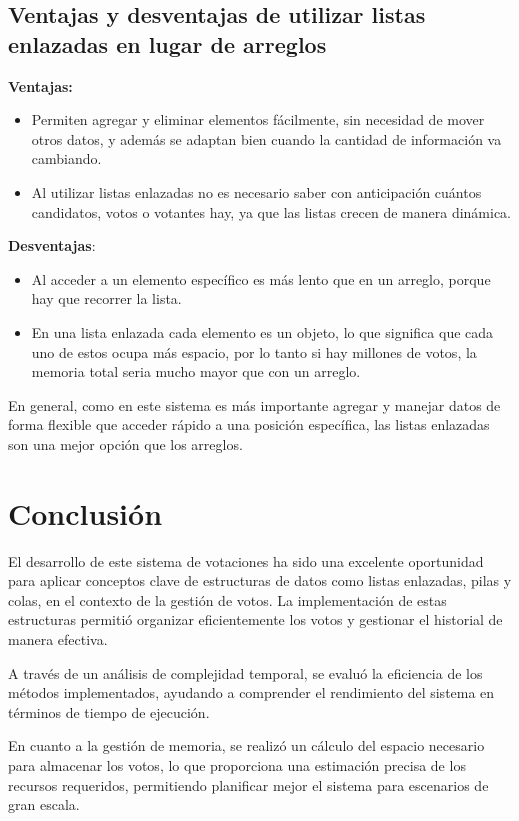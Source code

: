 \documentclass[12pt]{article}
\begin{document}
\subsection{Ventajas y desventajas de utilizar listas enlazadas en lugar de arreglos  }

\textbf{Ventajas:} 
\begin{itemize}
    \item Permiten agregar y eliminar elementos fácilmente, sin necesidad de mover otros datos, y además se adaptan bien cuando la cantidad de información va cambiando.
    \item Al utilizar listas enlazadas no es necesario saber con anticipación cuántos candidatos, votos o votantes hay, ya que las listas crecen de manera dinámica.
\end{itemize}

\textbf{Desventajas}: 
\begin{itemize}
    \item Al acceder a un elemento específico es más lento que en un arreglo, porque hay que recorrer la lista.
    \item En una lista enlazada cada elemento es un objeto, lo que significa que cada uno de estos ocupa más espacio, por lo tanto si hay millones de votos, la memoria total seria mucho mayor que con un arreglo.
\end{itemize}

En general, como en este sistema es más importante agregar y manejar datos de forma flexible que acceder rápido a una posición específica, las listas enlazadas son una mejor opción que los arreglos.

\pagebreak

\section{Conclusión}

El desarrollo de este sistema de votaciones ha sido una excelente oportunidad para aplicar conceptos clave de estructuras de datos como listas enlazadas, pilas y colas, en el contexto de la gestión de votos. La implementación de estas estructuras permitió organizar eficientemente los votos y gestionar el historial de manera efectiva.

A través de un análisis de complejidad temporal, se evaluó la eficiencia de los métodos implementados, ayudando a comprender el rendimiento del sistema en términos de tiempo de ejecución.

En cuanto a la gestión de memoria, se realizó un cálculo del espacio necesario para almacenar los votos, lo que proporciona una estimación precisa de los recursos requeridos, permitiendo planificar mejor el sistema para escenarios de gran escala.
\end{document}
